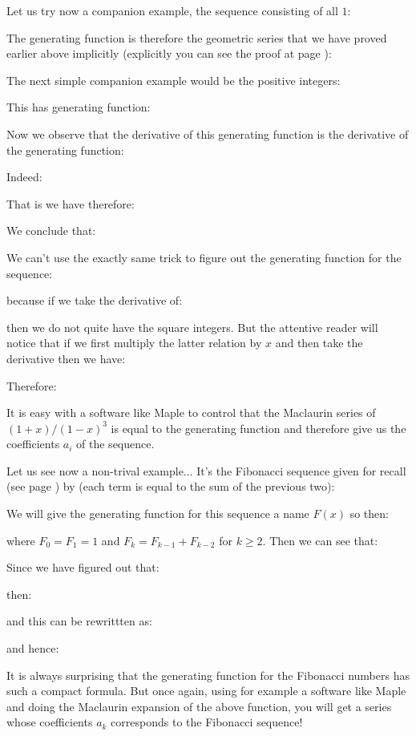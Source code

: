 	Let us try now a companion example, the sequence consisting of all $1$:
	
	The generating function is therefore the geometric series that we have proved earlier above implicitly (explicitly you can see the proof at page \pageref{sum of powers}):
	
	The next simple companion example would be the positive integers:
	
	This has generating function:
	
	Now we observe that the derivative of this generating function is the derivative of the generating function:
	
	Indeed:
	
	That is we have therefore:
	
	We conclude that:
	
	We can't use the exactly same trick to figure out the generating function for the sequence:
	
	because if we take the derivative of:
	
	then we do not quite have the square integers. But the attentive reader will notice that if we first multiply the latter relation by $x$ and then take the derivative then we have:
	
	Therefore:
	
	It is easy with a software like Maple to control that the Maclaurin series of $(1+x)/(1-x)^3$ is equal to the generating function and therefore give us the coefficients $a_i$ of the sequence.
	
	Let us see now a non-trival example... It's the Fibonacci sequence given for recall (see page \pageref{Fibonacci Sequence}) by (each term is equal to the sum of the previous two):
	
	We will give the generating function for this sequence a name $F(x)$ so then:
	
	where $F_0=F_1=1$ and $F_k=F_{k-1}+F_{k-2}$ for $k\geq 2$. Then we can see that:
	
	Since we have figured out that:
	
	then:
	
	and this can be rewrittten as:
	
	and hence:
	
	It is always surprising that the generating function for the Fibonacci numbers has such a compact formula. But once again, using for example a software like Maple and doing the Maclaurin expansion of the above function, you will get a series whose coefficients $a_k$ corresponds to the Fibonacci sequence!
	
